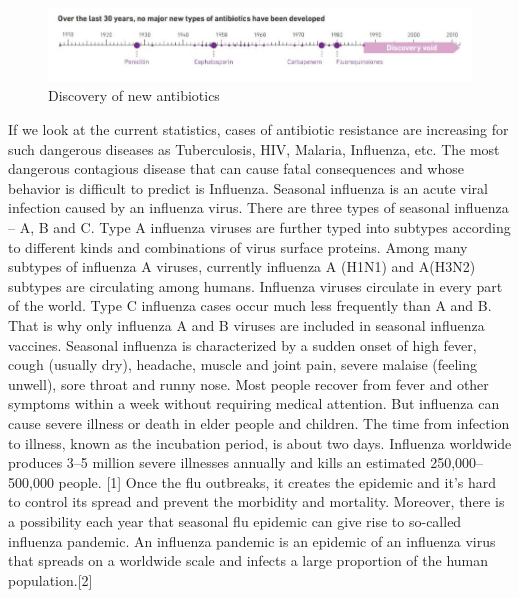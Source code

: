 \begin{figure}[H]
  \centering
  \includegraphics[width=\textwidth]{img/Fig5}
  \caption{Discovery of new antibiotics}
  \label{fig5}
\end{figure}

If we look at the current statistics, cases of antibiotic resistance are increasing for such dangerous diseases as Tuberculosis, HIV, Malaria, Influenza, etc. The most dangerous contagious disease that can cause fatal consequences and whose behavior is difficult to predict is Influenza. Seasonal influenza is an acute viral infection caused by an influenza virus. There are three types of seasonal influenza – A, B and C. Type A influenza viruses are further typed into subtypes according to different kinds and combinations of virus surface proteins. Among many subtypes of influenza A viruses, currently influenza A (H1N1) and A(H3N2) subtypes are circulating among humans. Influenza viruses circulate in every part of the world. Type C influenza cases occur much less frequently than A and B. That is why only influenza A and B viruses are included in seasonal influenza vaccines. Seasonal influenza is characterized by a sudden onset of high fever, cough (usually dry), headache, muscle and joint pain, severe malaise (feeling unwell), sore throat and runny nose. Most people recover from fever and other symptoms within a week without requiring medical attention. But influenza can cause severe illness or death in elder people and children. The time from infection to illness, known as the incubation period, is about two days. Influenza worldwide produces 3–5 million severe illnesses annually and kills an estimated 250,000–500,000 people. [1] Once the flu outbreaks, it creates the epidemic and it’s hard to control its spread and prevent the morbidity and mortality. Moreover, there is a possibility each year that seasonal flu epidemic can give rise to so-called influenza pandemic. An influenza pandemic is an epidemic of an influenza virus that spreads on a worldwide scale and infects a large proportion of the human population.[2]


